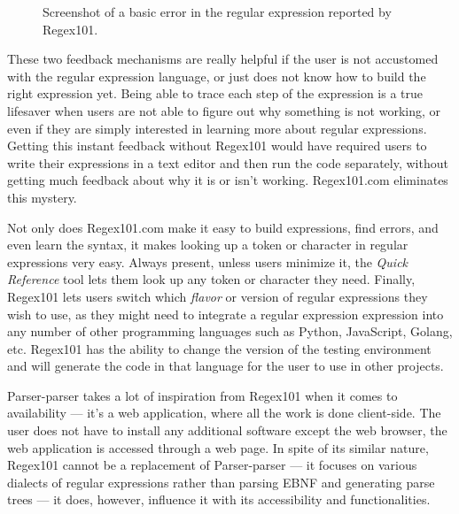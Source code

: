 \documentclass[english,bachelors,forcepolishlogotype]{wizthesis}
\newcommand{\thisproject}{Parser-parser}
\begin{document}
{\begin{figure}[ht]
  \centering
  \caption{Screenshot of a basic error in the regular expression reported by
  Regex101.}
  \label{fig:regex101-error}
\end{figure}

These two feedback mechanisms are really helpful if the user is not accustomed
with the regular expression language, or just does not know how to build the
right expression yet. Being able to trace each step of the expression is a true
lifesaver when users are not able to figure out why something is not working, or
even if they are simply interested in learning more about regular expressions.
Getting this instant feedback without Regex101 would have required users to
write their expressions in a text editor and then run the code separately,
without getting much feedback about why it is or isn't working. Regex101.com
eliminates this mystery.

Not only does Regex101.com make it easy to build expressions, find errors, and
even learn the syntax, it makes looking up a token or character in regular
expressions very easy. Always present, unless users minimize it, the \emph{Quick
Reference} tool lets them look up any token or character they need. Finally,
Regex101 lets users switch which \emph{flavor} or version of regular expressions
they wish to use, as they might need to integrate a regular expression
expression into any number of other programming languages such as Python,
JavaScript, Golang, etc. Regex101 has the ability to change the version of the
testing environment and will generate the code in that language for the user to
use in other projects.}

\thisproject{} takes a lot of inspiration from Regex101 when it comes to
availability --- it's a web application, where all the work is done client-side.
The user does not have to install any additional software except the web
browser, the web application is accessed through a web page. In spite of its
similar nature, Regex101 cannot be a replacement of \thisproject{} --- it
focuses on various dialects of regular expressions rather than parsing EBNF and
generating parse trees --- it does, however, influence it with its accessibility
and functionalities.
\end{document}
